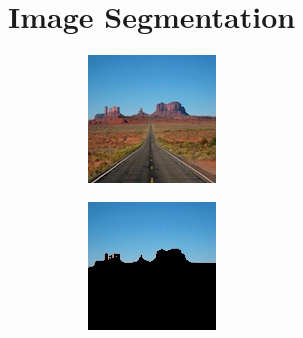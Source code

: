 \section*{Image Segmentation}

\begin{figure}
    \centering
    \begin{subfigure}{0.31\textwidth}
        \includegraphics[width=\textwidth]{RegMon.png}
    \end{subfigure}
   \hspace*{\fill}
    \begin{subfigure}{0.31\textwidth}
        \includegraphics[width=\textwidth]{NegMon.png}

\end{subfigure}
\end{figure}
